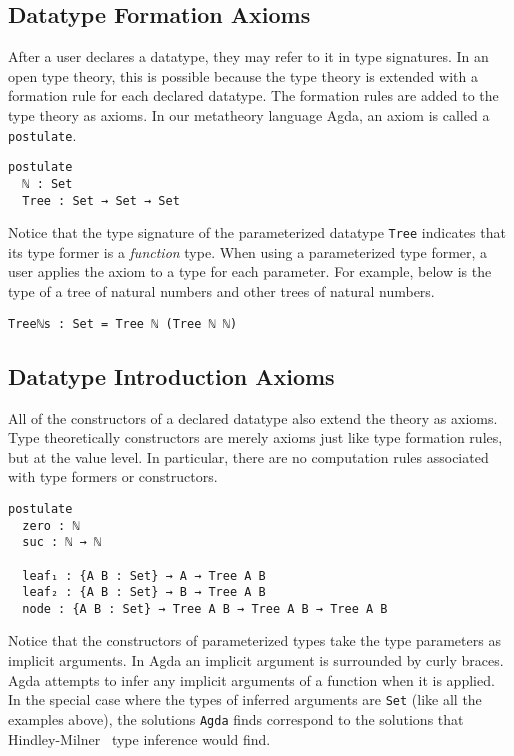 \documentclass[runningheads,a4paper]{llncs}
\begin{document}
\subsection{Datatype Formation Axioms}

After a user declares a datatype, they may refer to it in type
signatures. In an open type theory, this is possible because the type
theory is extended with a formation rule for each declared datatype.
The formation rules are added to the type theory as axioms. In our
metatheory language {\sc Agda}, an axiom is called a {\tt postulate}.

\begin{verbatim}
postulate
  ℕ : Set
  Tree : Set → Set → Set
\end{verbatim}

Notice that the type signature of the parameterized datatype
{\tt Tree} indicates that its type former is a
{\it function} type. When using a parameterized type former, a user applies
the axiom to a type for each parameter. For example, below is the type
of a tree of natural numbers and other trees of natural numbers.

\begin{verbatim}
Treeℕs : Set = Tree ℕ (Tree ℕ ℕ)
\end{verbatim}

\subsection{Datatype Introduction Axioms}

All of the constructors of a declared datatype also extend the theory
as axioms. Type theoretically constructors are merely axioms just
like type formation rules, but at the value level. In particular, there are
no computation rules associated with type formers or constructors.

\begin{verbatim}
postulate
  zero : ℕ
  suc : ℕ → ℕ

  leaf₁ : {A B : Set} → A → Tree A B
  leaf₂ : {A B : Set} → B → Tree A B
  node : {A B : Set} → Tree A B → Tree A B → Tree A B
\end{verbatim}

Notice that the constructors of parameterized types take the type
parameters as implicit arguments. In {\sc Agda} an implicit argument
is surrounded by curly braces. {\sc Agda} attempts to infer any
implicit arguments of a function when it is applied. In the special
case where the types of inferred arguments are {\tt Set} (like all the
examples above), the solutions {\tt Agda} finds correspond to the
solutions that Hindley-Milner~\cite{milner1978theory} type inference would find.
\end{document}
